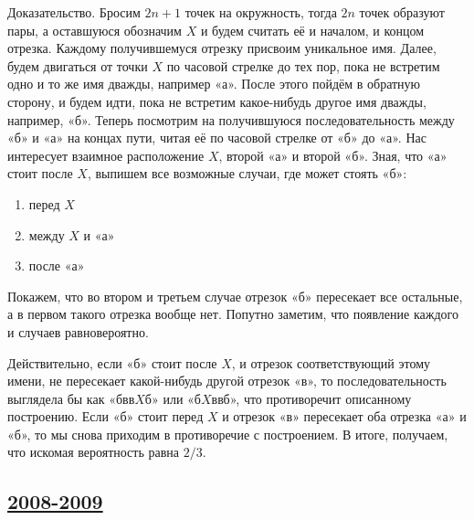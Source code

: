 \begin{enumerate}
Доказательство. Бросим $2n+1$ точек на окружность, тогда $2n$ точек образуют пары, а оставшуюся обозначим $X$ и будем считать её и началом, и концом отрезка.
Каждому получившемуся отрезку присвоим уникальное имя.
Далее, будем двигаться от точки $X$ по часовой стрелке до тех пор, пока не встретим одно и то же имя дважды, например «а».
После этого пойдём в обратную сторону, и будем идти, пока не встретим какое-нибудь другое имя дважды, например, «б».
Теперь посмотрим на получившуюся последовательность между «б» и «а» на концах пути, читая её по часовой стрелке от «б» до «а».
Нас интересует взаимное расположение $X$, второй «а» и второй «б».
Зная, что «а» стоит после $X$, выпишем все возможные случаи, где может стоять «б»:
\begin{enumerate}
\item перед $X$
\item между $X$ и «а»
\item после «а»
\end{enumerate}
Покажем, что во втором и третьем случае отрезок «б» пересекает все остальные, а в первом такого отрезка вообще нет. Попутно заметим, что появление каждого и случаев равновероятно.

Действительно, если «б» стоит после $X$, и отрезок соответствующий этому имени, не пересекает какой-нибудь другой отрезок «в», то последовательность выглядела бы как «бвв$X$б» или «б$X$ввб», что противоречит описанному построению.
Если «б» стоит перед $X$ и отрезок «в» пересекает оба отрезка «а» и «б», то мы снова приходим в противоречие с построением.
В итоге, получаем, что искомая вероятность равна $2/3$.
\end{enumerate}


\subsection[2008-2009]{\hyperref[sec:kr_01_2008_2009]{2008-2009}}
\label{sec:sol_kr_01_2008_2009}

